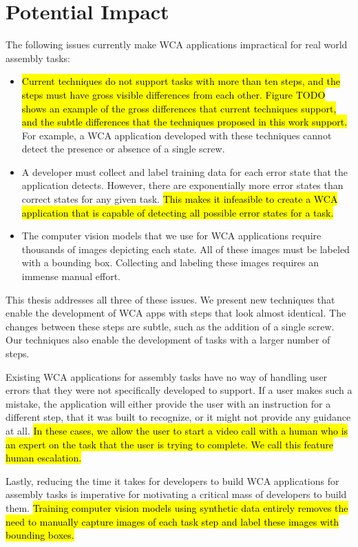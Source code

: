 \section{Potential Impact}

The following issues currently make WCA applications impractical for real world
assembly tasks:
\begin{itemize}
\item \hl{Current techniques do not support tasks with more than ten steps, and the
  steps must have gross visible differences from each other.
  Figure TODO shows an example of the gross differences that current techniques
  support, and the subtle differences that the techniques proposed in this work
  support.}
  For example, a WCA application developed with these techniques cannot detect
  the presence or absence of a single screw.
\item A developer must collect and label training data for each error state
  that the application detects.
  However, there are exponentially more error states than correct
  states for any given task.
  \hl{This makes it infeasible to create a WCA application that is capable of
  detecting all possible error states for a task.}
\item The computer vision models that we use for WCA applications require
  thousands of images depicting each state.
  All of these images must be labeled with a bounding box.
  Collecting and labeling these images requires an immense manual effort.
\end{itemize}

This thesis addresses all three of these issues.
We present new techniques that enable the development of WCA apps with steps
that look almost identical.
The changes between these steps are subtle, such as the addition of a single
screw.
Our techniques also enable the development of tasks with a larger number of
steps.

Existing WCA applications for assembly tasks have no way of handling user
errors that they were not specifically developed to support.
If a user makes such a mistake, the application will either provide
the user with an instruction for a different step, that it was built to
recognize, or it might not provide any guidance at all.
\hl{In these cases, we allow the user to start a video call with a human who is
  an expert on the task that the user is trying to complete.
  We call this feature human escalation.
}

Lastly, reducing the time it takes for developers to build WCA applications for
assembly tasks is imperative for motivating a critical mass of developers to
build them.
\hl{
  Training computer vision models using synthetic data entirely removes the need
  to manually capture
  images of each task step and label these images with bounding boxes.
}

